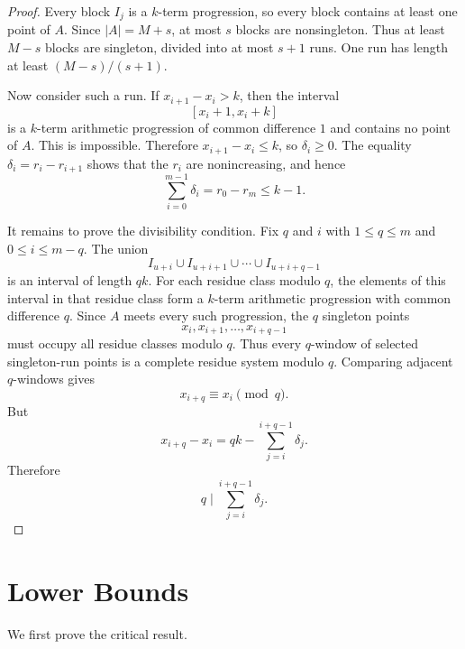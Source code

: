 \documentclass[10pt,a4paper]{amsart}
\numberwithin{equation}{section}
\begin{document}
\begin{proof}
Every block $I_j$ is a $k$-term progression, so every block contains at least one point of $A$.
Since $|A|=M+s$, at most $s$ blocks are nonsingleton.
Thus at least $M-s$ blocks are singleton, divided into at most $s+1$ runs.
One run has length at least $(M-s)/(s+1)$.

Now consider such a run.
If $x_{i+1}-x_i>k$, then the interval
\[
        [x_i+1,x_i+k]
\]
is a $k$-term arithmetic progression of common difference $1$ and contains no point of $A$.
This is impossible.
Therefore $x_{i+1}-x_i\le k$, so $\delta_i\ge0$.
The equality $\delta_i=r_i-r_{i+1}$ shows that the $r_i$ are nonincreasing, and hence
\[
        \sum_{i=0}^{m-1}\delta_i=r_0-r_m\le k-1.
\]

It remains to prove the divisibility condition.
Fix $q$ and $i$ with $1\le q\le m$ and $0\le i\le m-q$.
The union
\[
        I_{u+i}\cup I_{u+i+1}\cup\cdots\cup I_{u+i+q-1}
\]
is an interval of length $qk$.
For each residue class modulo $q$, the elements of this interval in that residue class form a $k$-term arithmetic progression with common difference $q$.
Since $A$ meets every such progression, the $q$ singleton points
\[
        x_i,x_{i+1},\ldots,x_{i+q-1}
\]
must occupy all residue classes modulo $q$.
Thus every $q$-window of selected singleton-run points is a complete residue system modulo $q$.
Comparing adjacent $q$-windows gives
\[
        x_{i+q}\equiv x_i\pmod q.
\]
But
\[
        x_{i+q}-x_i
        =qk-
        \sum_{j=i}^{i+q-1}\delta_j.
\]
Therefore
\[
        q\mid \sum_{j=i}^{i+q-1}\delta_j.
\]
\end{proof}

\section{Lower Bounds}

We first prove the critical result.
\end{document}
